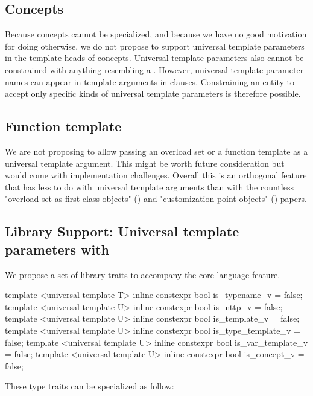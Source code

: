 \documentclass{wg21}
\begin{document}
\subsection{Concepts}

Because concepts cannot be specialized, and because we have no good motivation for doing otherwise, we do not propose to support universal template parameters in the template heads of concepts.
Universal template parameters also cannot be constrained with anything resembling a .
However, universal template parameter names can appear in template arguments in  clauses.
Constraining an entity to accept only specific kinds of universal template parameters is therefore possible.


\subsection{Function template}


We are not proposing to allow passing an overload set or a function template as a universal template argument.
This might be worth future consideration but would come with implementation challenges.
Overall this is an orthogonal feature that has less to do with universal template arguments than with the countless
"overload set as first class objects" () and "customization point objects" () papers.


\subsection{Library Support: Universal template parameters with }

We propose a set of library traits to accompany the core language feature.


\begin{colorblock}
template <universal template T>
inline constexpr bool is_typename_v = false;
template <universal template U>
inline constexpr bool is_nttp_v = false;
template <universal template U>
inline constexpr bool is_template_v = false;
template <universal template U>
inline constexpr bool is_type_template_v = false;
template <universal template U>
inline constexpr bool is_var_template_v = false;
template <universal template U>
inline constexpr bool is_concept_v = false;
\end{colorblock}

These type traits can be specialized as follow:
\end{document}
